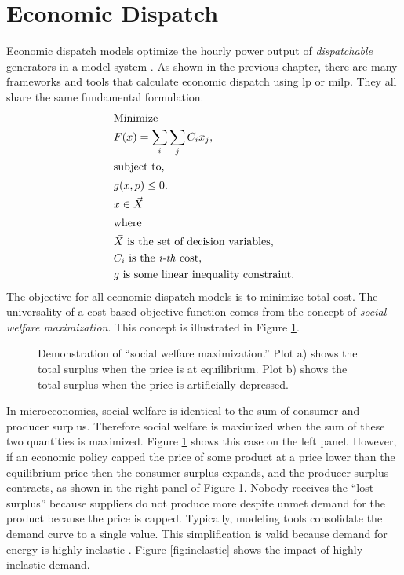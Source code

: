 \section{Economic Dispatch}
\label{section:dispatch}

Economic dispatch models optimize the hourly power output of \textit{dispatchable} 
generators in a model system \cite{de_queiroz_repurposing_2019,neumann_near-optimal_2021}.
As shown in the previous chapter, there are many frameworks and tools
that calculate economic dispatch using \ac{lp} or \ac{milp}. They all share the same fundamental
formulation.
\begin{align}
    \intertext{Minimize}
    &F(x) = \sum_i\sum_j{C_i x_j},\\
    \intertext{subject to,}
    &g(x, p) \leq 0.\nonumber\\
    &x \in \vec{X}\nonumber\\
    \intertext{where}
    &\vec{X} \text{ is the set of decision variables,}\nonumber\\
    & C_i \text{ is the \textit{i-th} cost,}\nonumber\\
    & g \text{ is some linear inequality constraint.}
\end{align}
The objective for all economic dispatch models is to minimize total 
cost. The universality of a cost-based objective function comes from the concept of 
\textit{social welfare maximization}. This concept is illustrated in Figure \ref{fig:social-max}.

\begin{figure}[H]
  \centering
  \resizebox{\columnwidth}{!}{}
  \caption{Demonstration of ``social welfare maximization.'' Plot a) shows the total surplus when the price is at equilibrium. Plot b)
  shows the total surplus when the price is artificially depressed.}
  \label{fig:social-max}
\end{figure}

In microeconomics, social welfare is identical to the sum of consumer and producer surplus.
Therefore social welfare is maximized when the sum of these two quantities is maximized. Figure 
\ref{fig:social-max} shows this case on the left panel. However, if an economic policy capped
the price of some product at a price lower than the equilibrium price then the consumer surplus
expands, and the producer surplus contracts, as shown in the right panel of Figure \ref{fig:social-max}. 
Nobody receives the ``lost surplus'' because suppliers do not produce more despite unmet demand 
for the product because the price is capped. Typically, modeling tools consolidate the demand
curve to a single value. This simplification is valid because demand for energy is highly 
inelastic \cite{eia_price_2021, labandeira_meta-analysis_2017, csereklyei_price_2020}. Figure \ref{fig:inelastic} shows the impact of highly inelastic demand.


